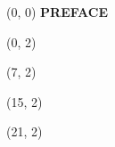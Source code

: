 \documentclass[10pt]{article}
\begin{document}
\begin{textblock}{31}(0, 0)
    \center\huge\textbf{PREFACE}
\end{textblock}

\begin{textblock}{6}(0, 2)
    {}
\end{textblock}

\begin{textblock}{7}(7, 2)
    {}
\end{textblock}

\begin{textblock}{5}(15, 2)
    {}
\end{textblock}

\begin{textblock}{10}(21, 2)
    {}
\end{textblock}
\end{document}
